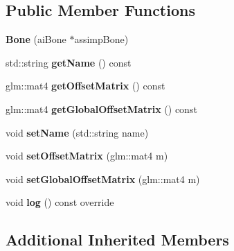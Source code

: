 \subsection*{Public Member Functions}
\begin{DoxyCompactItemize}
\item 
{\bfseries Bone} (ai\+Bone $\ast$assimp\+Bone)\hypertarget{classflw_1_1flf_1_1Bone_a392042b750cc4bf561825ee302202fb5}{}\label{classflw_1_1flf_1_1Bone_a392042b750cc4bf561825ee302202fb5}

\item 
std\+::string {\bfseries get\+Name} () const \hypertarget{classflw_1_1flf_1_1Bone_aa3d313fe671f82035501e9d861bfe8e9}{}\label{classflw_1_1flf_1_1Bone_aa3d313fe671f82035501e9d861bfe8e9}

\item 
glm\+::mat4 {\bfseries get\+Offset\+Matrix} () const \hypertarget{classflw_1_1flf_1_1Bone_ab3a2ea61469a5073849c474bea100820}{}\label{classflw_1_1flf_1_1Bone_ab3a2ea61469a5073849c474bea100820}

\item 
glm\+::mat4 {\bfseries get\+Global\+Offset\+Matrix} () const \hypertarget{classflw_1_1flf_1_1Bone_a017830c8a7fafbb3823114b65e9467a1}{}\label{classflw_1_1flf_1_1Bone_a017830c8a7fafbb3823114b65e9467a1}

\item 
void {\bfseries set\+Name} (std\+::string name)\hypertarget{classflw_1_1flf_1_1Bone_a6cf797dea162d2c87716ba961501b3f6}{}\label{classflw_1_1flf_1_1Bone_a6cf797dea162d2c87716ba961501b3f6}

\item 
void {\bfseries set\+Offset\+Matrix} (glm\+::mat4 m)\hypertarget{classflw_1_1flf_1_1Bone_a457c06cf7d1b77cf6a88e95800c13cf0}{}\label{classflw_1_1flf_1_1Bone_a457c06cf7d1b77cf6a88e95800c13cf0}

\item 
void {\bfseries set\+Global\+Offset\+Matrix} (glm\+::mat4 m)\hypertarget{classflw_1_1flf_1_1Bone_a32ce1f1f71f73a92e2916ff83b721e54}{}\label{classflw_1_1flf_1_1Bone_a32ce1f1f71f73a92e2916ff83b721e54}

\item 
void {\bfseries log} () const override\hypertarget{classflw_1_1flf_1_1Bone_ae1a421ceb6ee7d32bb01aa7f388c15a4}{}\label{classflw_1_1flf_1_1Bone_ae1a421ceb6ee7d32bb01aa7f388c15a4}

\end{DoxyCompactItemize}
\subsection*{Additional Inherited Members}



